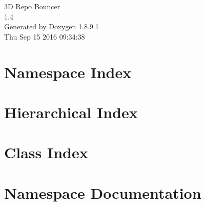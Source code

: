 \documentclass[twoside]{book}
\newcommand{\+}{\discretionary{\mbox{\scriptsize$\hookleftarrow$}}{}{}}
\newcommand{\clearemptydoublepage}{%
  \newpage{\pagestyle{empty}\cleardoublepage}%
}
\begin{document}
\hypersetup{pageanchor=false,
             bookmarks=true,
             bookmarksnumbered=true,
             pdfencoding=unicode
            }
\begin{titlepage}
\vspace*{7cm}
\begin{center}%
{\Large 3\+D Repo Bouncer \\[1ex]\large 1.\+4 }\\
\vspace*{1cm}
{\large Generated by Doxygen 1.8.9.1}\\
\vspace*{0.5cm}
{\small Thu Sep 15 2016 09:34:38}\\
\end{center}
\end{titlepage}
\clearemptydoublepage
\tableofcontents
\clearemptydoublepage
{}
\hypersetup{pageanchor=true}

\chapter{Namespace Index}

\chapter{Hierarchical Index}

\chapter{Class Index}

\chapter{Namespace Documentation}

\end{document}
